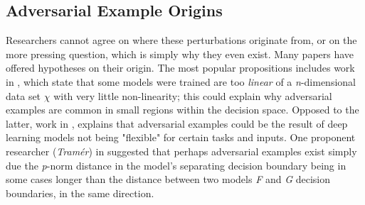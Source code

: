 \documentclass[grad,lot,lof,11pt,oneside,onehalfspace]{RUthesis}
\begin{document}
\subsection{Adversarial Example Origins}
Researchers cannot agree on where these perturbations originate from, or on the more pressing question, which is simply why they even exist. Many papers have offered hypotheses on their origin. The most popular propositions includes work in \cite{goodfellow_explaining_2015}, which state that some models were trained are too \textit{linear} of a \textit{n}-dimensional data set \textit{$\chi$} with very little non-linearity; this could explain why adversarial examples are common in small regions within the decision space. Opposed to the latter, work in \cite{papernot_transferability_2016}, explains that adversarial examples could be the result of deep learning models not being "flexible" for certain tasks and inputs. One proponent researcher (\textit{Tram\'{e}r}) in \cite{tramer_space_2017} suggested that perhaps adversarial examples exist simply due the \textit{p}-norm distance in the model's separating decision boundary being in some cases longer than the distance between two models \textit{F} and \textit{G} decision boundaries, in the same direction. 
\end{document}
